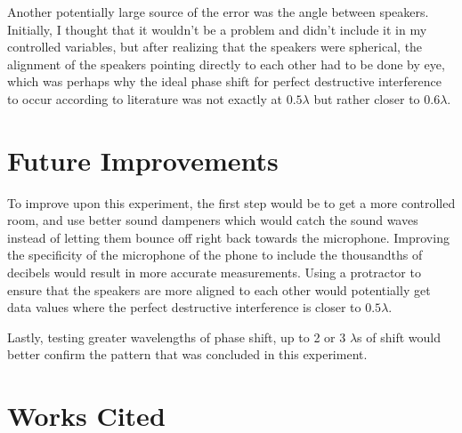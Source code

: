 \documentclass[index]{subfiles}
\begin{document}
Another potentially large source of the error was the angle between speakers. Initially, I thought that it wouldn't be a problem and didn't include it in my controlled variables, but after realizing that the speakers were spherical, the alignment of the speakers pointing directly to each other had to be done by eye, which was perhaps why the ideal phase shift for perfect destructive interference to occur according to literature was not exactly at \(0.5\lambda\) but rather closer to \(0.6\lambda\).


\section{Future Improvements}

To improve upon this experiment, the first step would be to get a more controlled room, and use better sound dampeners which would catch the sound waves instead of letting them bounce off right back towards the microphone. Improving the specificity of the microphone of the phone to include the thousandths of decibels would result in more accurate measurements. Using a protractor to ensure that the speakers are more aligned to each other would potentially get data values where the perfect destructive interference is closer to \(0.5\lambda\).

Lastly, testing greater wavelengths of phase shift, up to 2 or 3 \(\lambda\)s of shift would better confirm the pattern that was concluded in this experiment.

\section{Works Cited}

\printbibliography\
\end{document}

